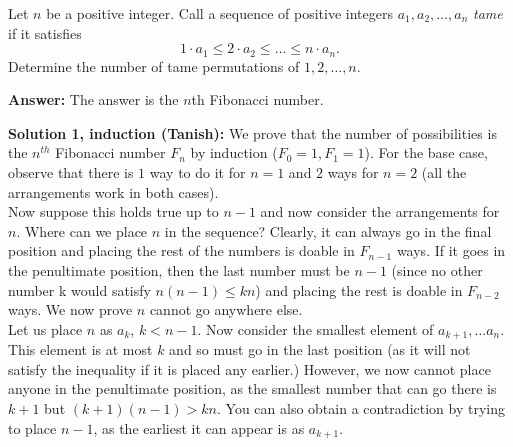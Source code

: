  Let $n$ be a positive integer. Call a sequence of positive integers $a_1, a_2, \ldots , a_n$ \emph{tame} if it satisfies
\[
1 \cdot a_1 \leq 2\cdot a_2\leq  \ldots \leq n \cdot a_n.
\]
Determine the number of tame permutations of $1,2, \ldots, n$.

\bigskip

\textbf{Answer:} The answer is the $n$th Fibonacci number.

\bigskip

\textbf{Solution 1, induction (Tanish):} We prove that the number of possibilities is the $n^{th}$ Fibonacci number $F_n$ by induction ($F_0 = 1, F_1 = 1$). For the base case, observe that there is $1$ way to do it for $n = 1$ and $2$ ways for $n = 2$ (all the arrangements work in both cases). \\
Now suppose this holds true up to $n-1$ and now consider the arrangements for $n$. Where can we place $n$ in the sequence? Clearly, it can always go in the final position and placing the rest of the numbers is doable in $F_{n-1}$ ways. If it goes in the penultimate position, then the last number must be $n-1$ (since no other number k would satisfy $n(n-1) \leq kn$) and placing the rest is doable in $F_{n-2}$ ways. We now prove $n$ cannot go anywhere else. \\
Let us place $n$ as $a_k$, $k < n-1$. Now consider the smallest element of $a_{k+1}, \dots a_n$. This element is at most $k$ and so must go in the last position (as it will not satisfy the inequality if it is placed any earlier.) However, we now cannot place anyone in the penultimate position, as the smallest number that can go there is $k+1$ but $(k+1)(n-1) > kn$. You can also obtain a contradiction by trying to place $n-1$, as the earliest it can appear is as $a_{k+1}$.

\bigskip

